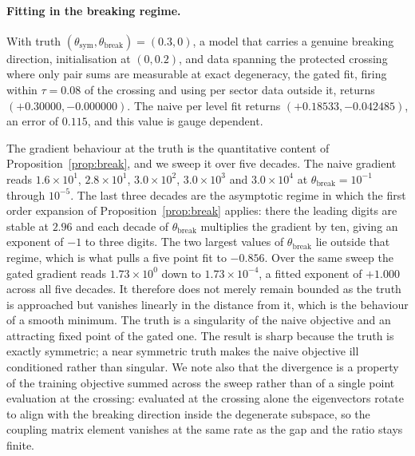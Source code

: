 \documentclass[11pt]{article}
\begin{document}
\paragraph{Fitting in the breaking regime.}
With truth
$(\theta_{\mathrm{sym}},\theta_{\mathrm{break}})=(0.3,0)$, a model that carries a
genuine breaking direction, initialisation at $(0,0.2)$, and data spanning the
protected crossing where only pair sums are measurable at exact degeneracy, the
gated fit, firing within $\tau=0.08$ of the crossing and using per sector data
outside it, returns $(+0.30000,-0.000000)$. The naive per level fit returns
$(+0.18533,-0.042485)$, an error of $0.115$, and this value is gauge dependent.

The gradient behaviour at the truth is the quantitative content of
Proposition~\ref{prop:break}, and we sweep it over five decades. The naive
gradient reads $1.6\times10^{1}$, $2.8\times10^{1}$, $3.0\times10^{2}$,
$3.0\times10^{3}$ and $3.0\times10^{4}$ at $\theta_{\mathrm{break}}=10^{-1}$
through $10^{-5}$. The last three decades are the asymptotic regime in which the
first order expansion of Proposition~\ref{prop:break} applies: there the leading
digits are stable at $2.96$ and each decade of $\theta_{\mathrm{break}}$
multiplies the gradient by ten, giving an exponent of $-1$ to three digits. The
two largest values of $\theta_{\mathrm{break}}$ lie outside that regime, which is
what pulls a five point fit to $-0.856$. Over the same sweep the gated gradient
reads $1.73\times10^{0}$ down to $1.73\times10^{-4}$, a fitted exponent of
$+1.000$ across all five decades. It therefore does not merely remain bounded as
the truth is approached but vanishes linearly in the distance from it, which is
the behaviour of a smooth minimum. The truth is a singularity of the naive
objective and an attracting fixed point of the gated one. The result is sharp
because the truth is exactly symmetric; a near symmetric truth makes the naive
objective ill conditioned rather than singular. We note also that the divergence
is a property of the training objective summed across the sweep rather than of a
single point evaluation at the crossing: evaluated at the crossing alone the
eigenvectors rotate to align with the breaking direction inside the degenerate
subspace, so the coupling matrix element vanishes at the same rate as the gap and
the ratio stays finite.
\end{document}
